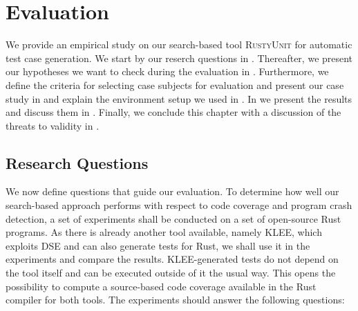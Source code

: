 \documentclass[paper=a4,%
  twoside,%
  BCOR4mm,%
  abstract=true,%
  toc=bibliography,%
  chapterprefix=true,%
  toc=bibliographynumbered,%
  open=right,%
  english,%
  pagesize=pdftex]{scrreprt}
\newcommand{\tech}{\textsc{RustyUnit}\xspace}
\begin{document}
\clearpage
\chapter{Evaluation}
\label{chap:evaluation}

We provide an empirical study on our search-based tool \tech for automatic test case generation. We start by our reserch questions in . Thereafter, we present our hypotheses we want to check during the evaluation in . Furthermore, we define the criteria for selecting case subjects for evaluation and present our case study in  and explain the environment setup we used in . In  we present the results and discuss them in . Finally, we conclude this chapter with a discussion of the threats to validity in .


\section{Research Questions}
\label{sec:research-questions}
We now define questions that guide our evaluation. To determine how well our search-based approach performs with respect to code coverage and program crash detection, a set of experiments shall be conducted on a set of open-source Rust programs. As there is already another tool available, namely \textsc{KLEE}, which exploits \ac{DSE} and can also generate tests for Rust, we shall use it in the experiments and compare the results. \textsc{KLEE}-generated tests do not depend on the tool itself and can be executed outside of it the usual way. This opens the possibility to compute a source-based code coverage available in the Rust compiler for both tools. The experiments should answer the following questions:

\end{document}
